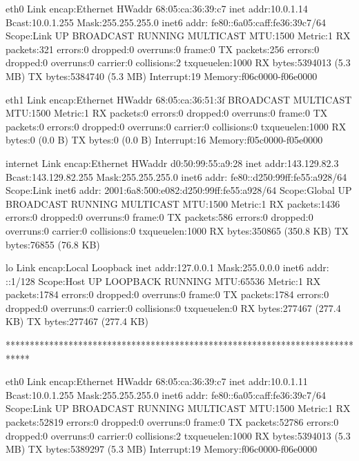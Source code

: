 eth0      Link encap:Ethernet  HWaddr 68:05:ca:36:39:c7  
          inet addr:10.0.1.14  Bcast:10.0.1.255  Mask:255.255.255.0
          inet6 addr: fe80::6a05:caff:fe36:39c7/64 Scope:Link
          UP BROADCAST RUNNING MULTICAST  MTU:1500  Metric:1
          RX packets:321 errors:0 dropped:0 overruns:0 frame:0
          TX packets:256 errors:0 dropped:0 overruns:0 carrier:0
          collisions:2 txqueuelen:1000 
          RX bytes:5394013 (5.3 MB)  TX bytes:5384740 (5.3 MB)
          Interrupt:19 Memory:f06c0000-f06e0000 

eth1      Link encap:Ethernet  HWaddr 68:05:ca:36:51:3f  
          BROADCAST MULTICAST  MTU:1500  Metric:1
          RX packets:0 errors:0 dropped:0 overruns:0 frame:0
          TX packets:0 errors:0 dropped:0 overruns:0 carrier:0
          collisions:0 txqueuelen:1000 
          RX bytes:0 (0.0 B)  TX bytes:0 (0.0 B)
          Interrupt:16 Memory:f05c0000-f05e0000 

internet  Link encap:Ethernet  HWaddr d0:50:99:55:a9:28  
          inet addr:143.129.82.3  Bcast:143.129.82.255  Mask:255.255.255.0
          inet6 addr: fe80::d250:99ff:fe55:a928/64 Scope:Link
          inet6 addr: 2001:6a8:500:e082:d250:99ff:fe55:a928/64 Scope:Global
          UP BROADCAST RUNNING MULTICAST  MTU:1500  Metric:1
          RX packets:1436 errors:0 dropped:0 overruns:0 frame:0
          TX packets:586 errors:0 dropped:0 overruns:0 carrier:0
          collisions:0 txqueuelen:1000 
          RX bytes:350865 (350.8 KB)  TX bytes:76855 (76.8 KB)

lo        Link encap:Local Loopback  
          inet addr:127.0.0.1  Mask:255.0.0.0
          inet6 addr: ::1/128 Scope:Host
          UP LOOPBACK RUNNING  MTU:65536  Metric:1
          RX packets:1784 errors:0 dropped:0 overruns:0 frame:0
          TX packets:1784 errors:0 dropped:0 overruns:0 carrier:0
          collisions:0 txqueuelen:0 
          RX bytes:277467 (277.4 KB)  TX bytes:277467 (277.4 KB)

*****************************************************************************

eth0      Link encap:Ethernet  HWaddr 68:05:ca:36:39:c7  
          inet addr:10.0.1.11  Bcast:10.0.1.255  Mask:255.255.255.0
          inet6 addr: fe80::6a05:caff:fe36:39c7/64 Scope:Link
          UP BROADCAST RUNNING MULTICAST  MTU:1500  Metric:1
          RX packets:52819 errors:0 dropped:0 overruns:0 frame:0
          TX packets:52786 errors:0 dropped:0 overruns:0 carrier:0
          collisions:2 txqueuelen:1000 
          RX bytes:5394013 (5.3 MB)  TX bytes:5389297 (5.3 MB)
          Interrupt:19 Memory:f06c0000-f06e0000 

